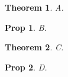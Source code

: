 \documentclass{article}
\newtheorem{theorem}{Theorem}
\newtheorem{prop}[theorem]{Prop}
\newtheorem{prop}{Prop}
\begin{document}
\begin{theorem}A.\end{theorem}
\begin{prop}B.\end{prop}
\begin{theorem}C.\end{theorem}
\begin{prop}D.\end{prop}
\end{document}
